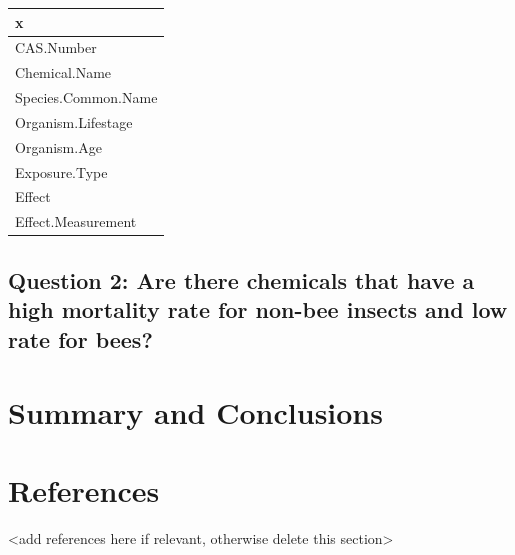 \documentclass[
  12pt,
]{article}
\begin{document}
\begin{longtable}[]{@{}l@{}}
\toprule
x \\
\midrule
\endhead
CAS.Number \\
Chemical.Name \\
Species.Common.Name \\
Organism.Lifestage \\
Organism.Age \\
Exposure.Type \\
Effect \\
Effect.Measurement \\
\bottomrule
\end{longtable}

\hypertarget{question-2-are-there-chemicals-that-have-a-high-mortality-rate-for-non-bee-insects-and-low-rate-for-bees}{%
\subsection{Question 2: Are there chemicals that have a high mortality
rate for non-bee insects and low rate for
bees?}\label{question-2-are-there-chemicals-that-have-a-high-mortality-rate-for-non-bee-insects-and-low-rate-for-bees}}

\newpage

\hypertarget{summary-and-conclusions}{%
\section{Summary and Conclusions}\label{summary-and-conclusions}}

\newpage

\hypertarget{references}{%
\section{References}\label{references}}

\textless add references here if relevant, otherwise delete this
section\textgreater{}
\end{document}
